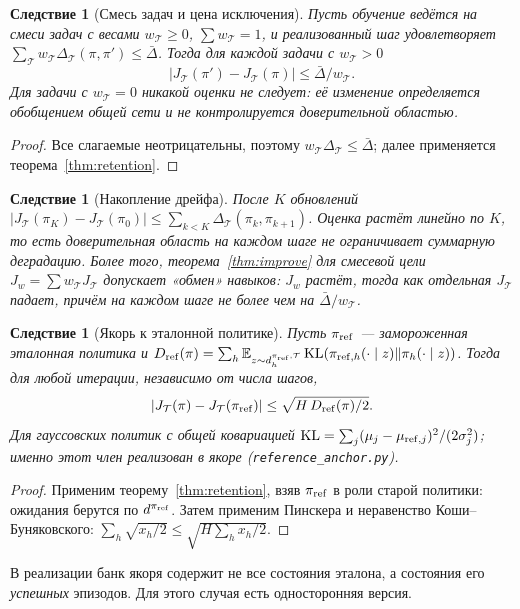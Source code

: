 \documentclass[11pt,a4paper]{article}
\theoremstyle{plain}
\newtheorem{corollary}[theorem]{Следствие}
\theoremstyle{definition}
\theoremstyle{remark}
\newcommand{\E}{\mathbb{E}}
\DeclareMathOperator{\KL}{KL}
\newcommand{\cT}{\mathcal{T}}
\begin{document}
\begin{corollary}[Смесь задач и цена исключения]\label{cor:mixture}
Пусть обучение ведётся на смеси задач с весами $w_\cT\ge0$, $\sum w_\cT=1$, и реализованный шаг удовлетворяет $\sum_\cT w_\cT\Delta_\cT(\pi,\pi')\le\bar\Delta$. Тогда для каждой задачи с $w_\cT>0$
\[
|J_\cT(\pi')-J_\cT(\pi)|\le\bar\Delta/w_\cT .
\]
Для задачи с $w_\cT=0$ никакой оценки не следует: её изменение определяется обобщением общей сети и не контролируется доверительной областью.
\end{corollary}
\begin{proof}
Все слагаемые неотрицательны, поэтому $w_\cT\Delta_\cT\le\bar\Delta$; далее применяется теорема~\ref{thm:retention}.
\end{proof}

\begin{corollary}[Накопление дрейфа]\label{cor:drift}
После $K$ обновлений $|J_\cT(\pi_K)-J_\cT(\pi_0)|\le\sum_{k<K}\Delta_\cT(\pi_k,\pi_{k+1})$. Оценка растёт линейно по $K$, то есть доверительная область на каждом шаге \emph{не} ограничивает суммарную деградацию. Более того, теорема~\ref{thm:improve} для смесевой цели $J_w=\sum w_\cT J_\cT$ допускает «обмен» навыков: $J_w$ растёт, тогда как отдельная $J_\cT$ падает, причём на каждом шаге не более чем на $\bar\Delta/w_\cT$.
\end{corollary}

\begin{corollary}[Якорь к эталонной политике]\label{cor:anchor}
Пусть $\pi_{\rm ref}$ --- замороженная эталонная политика и
$D_{\rm ref}(\pi)=\sum_h\E_{z\sim d^{\pi_{\rm ref},\cT}_h}\KL(\pi_{{\rm ref},h}(\cdot\mid z)\|\pi_h(\cdot\mid z))$. Тогда для \emph{любой} итерации, независимо от числа шагов,
\[
|J_\cT(\pi)-J_\cT(\pi_{\rm ref})|\le\sqrt{H\,D_{\rm ref}(\pi)/2}.
\]
Для гауссовских политик с общей ковариацией $\KL=\sum_j(\mu_j-\mu_{{\rm ref},j})^2/(2\sigma_j^2)$; именно этот член реализован в якоре (\texttt{reference\_anchor.py}).
\end{corollary}
\begin{proof}
Применим теорему~\ref{thm:retention}, взяв $\pi_{\rm ref}$ в роли старой политики: ожидания берутся по $d^{\pi_{\rm ref}}$. Затем применим Пинскера и неравенство Коши--Буняковского: $\sum_h\sqrt{x_h/2}\le\sqrt{H\sum_hx_h/2}$.
\end{proof}

В реализации банк якоря содержит не все состояния эталона, а состояния его \emph{успешных} эпизодов. Для этого случая есть односторонняя версия.
\end{document}
